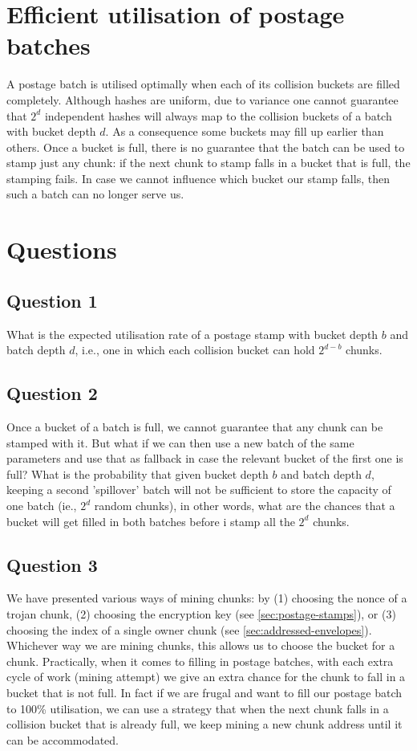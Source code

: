 \section{Efficient utilisation of postage batches}\label{sec:complexity-filling}

A postage batch is utilised optimally when each of its collision buckets are filled completely. Although hashes are uniform, due to variance one cannot guarantee that $2^d$ independent hashes will always map to the collision buckets of a batch with bucket depth $d$. As a consequence some buckets may fill up earlier than others. Once a bucket is full, there is no guarantee that the batch can be used to stamp just any chunk: if the next chunk to stamp falls in a bucket that is full, the stamping fails. In case  we cannot influence which bucket our stamp falls, then such a batch can no longer serve us.

\section{Questions}

\subsection*{Question 1}
What is the expected utilisation rate of a postage stamp with bucket depth $b$ and batch depth $d$, i.e., one in which each collision bucket can hold $2^{d-b}$ chunks.

 
\subsection*{Question 2}
Once a bucket of a batch is full, we cannot guarantee that any  chunk can be stamped with it. But what if we can then use a new batch of the same parameters and use that as fallback in case the relevant bucket of the first one is full? What is the probability that given bucket depth $b$ and batch depth $d$, keeping a second 'spillover' batch will not be sufficient to store the capacity of one batch (ie., $2^d$ random chunks), in other words, what are the chances that a bucket will get filled in both batches before i stamp all the $2^d$ chunks.

\subsection*{Question 3}

We have presented various ways of mining chunks: by (1) choosing the nonce of a trojan chunk, (2) choosing the encryption key (see \ref{sec:postage-stamps}), or (3) choosing the index of a single owner chunk (see \ref{sec:addressed-envelopes}). Whichever way we are mining chunks, this allows us to choose the bucket for a chunk. Practically, when it comes to filling in postage batches, with each extra cycle of work (mining attempt) we give an extra chance for the chunk to fall in a bucket that is not full.
In fact if we are frugal and want to fill our postage batch to 100\%
utilisation, we can use a strategy that when the next chunk falls in a collision bucket that is already full, we keep mining a new chunk address until it can be accommodated.

